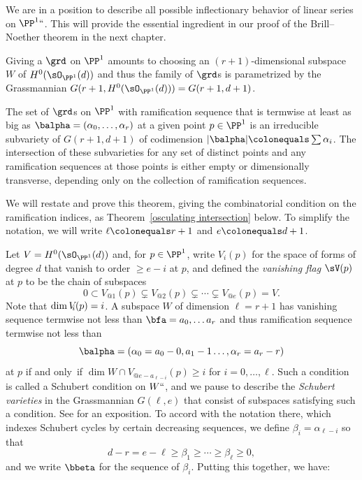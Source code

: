 We are in a position to describe all possible inflectionary behavior of
%
%
linear series on $\PP^1` `$. This will provide the essential ingredient
in our proof of the Brill--Noether theorem in the next chapter.

Giving a 
$\grd$
%
on $\PP^{1}$ amounts to choosing an $(r+1)$-dimensional
subspace $W$ of  $H^{0}(\sO_{\PP^{1}}(d))$ and thus the family of $\grd$s
is parametrized by the
Grassmannian 
%
$G(r+1, H^{0}(\sO_{\PP^{1}}(d))) = G(r+1, d+1)$.

\begin{theorem}\label{transversality of ramification}
The set of $\grd$s on $\PP^{1}$  with ramification sequence that is
termwise at least as big as $\balpha = (\alpha_{0}, \dots, \alpha_{r})$
at a
given point $p\in \PP^{1}$
is an irreducible subvariety of $G(r+1,d+1)$ of codimension 
$|\balpha| \colonequals  \sum \alpha_{i}$. The intersection
of these subvarieties for any set of distinct points and any ramification
sequences at those points
is either empty or 
%
dimensionally transverse, depending only on the
collection of 
ramification sequences.
%
\end{theorem}

We will restate and prove this theorem, giving the combinatorial condition
on the ramification indices,
as Theorem~\ref{osculating intersection} below. To simplify the notation,
we will write $\ell \colonequals  r+1$ 
and
$e\colonequals  d+1$.


Let $V =H^{0}(\sO_{\PP^{1}}(d))$ and, for $p\in \PP^{1}$, write $V_{i}(p)$
for the space of
forms of degree $d$ that vanish to order $\geq e-i$ at $p$, and defined
%
the \emph{vanishing flag} $\sV(p)$ at $p$
to be the chain of subspaces
$$
0\subset V_{@1}(p) \subsetneq V_{@2}(p) \subsetneq\cdots\subsetneq V_{@e}(p)
= V.
$$
Note that $\dim V_{\mskip-5mu i}(p) = i$.
A subspace $W$ of dimension $\ell = r+1$ has vanishing sequence termwise
not less than
$\bfa = a_{0}, \dots a_{r}$ and thus
ramification sequence termwise not less than
$$
\balpha = (\alpha_{0} = a_{0}-0, a_{1}-1 \dots, \alpha_{r}= a_{r}-r)
$$
 at $p$ if and only~if
$\dim W\cap V_{@e-a_{\ell-i}}(p)\geq  i$  for  $i = 0,\dots, \ell$.
Such a condition is called a 
Schubert condition
%
%
on $W` `$, and we pause to describe the \emph{Schubert varieties} in
the Grassmannian $G(\ell, e)$ that consist
of subspaces satisfying such a condition. See 
\cite[Chapters
3 and 4]{3264} for an exposition.
To accord with the notation there, which indexes Schubert cycles by
certain decreasing sequences,
we define $\beta_{i} = \alpha_{\ell-i}$ so that
$$
d-r = e-\ell \geq \beta_{1} \geq \cdots \geq \beta_{\ell}\geq 0,
$$
and we write $\bbeta$ for the sequence of $\beta_{i}$. Putting this
together, we have:

